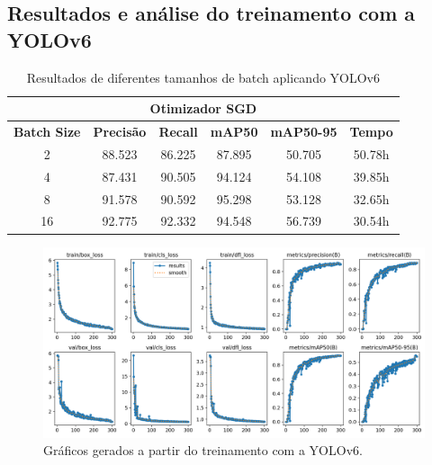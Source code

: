 \subsection{Resultados e análise do treinamento com a YOLOv6}

\begin{table}[!hbt]
    \centering
    \begin{tabular}{|c|c|c|c|c|c|}
    \hline
    \multicolumn{6}{|c|}{\textbf{Otimizador SGD}} \\ \hline
    \textbf{Batch Size} & \textbf{Precisão} & \textbf{Recall} & \textbf{mAP50} & \textbf{mAP50-95} & \textbf{Tempo} \\ \hline
    2                   & 88.523                & 86.225               & 87.895              & 50.705                 & 50.78h             \\ \hline
    4                   & 87.431                 & 90.505               & 94.124             & 54.108                & 39.85h             \\ \hline
    8                   & 91.578                 & 90.592               & 95.298              & 53.128                 & 32.65h             \\ \hline
    16                  & 92.775                & 92.332               & 94.548             & 56.739                 & 30.54h             \\ \hline
    \end{tabular}
    \caption{Resultados de diferentes tamanhos de batch aplicando YOLOv6}
    \label{tab:yolov6-teste}
\end{table}


\begin{figure}[!h]
    \centering
    \begin{minipage}{1\linewidth}
    \centering
    \captionsetup{justification=centering,margin=0.5cm,font=small}
    \includegraphics[width=1\linewidth]{img/cap6/results-yolov6-batch-16.png}
    \caption{Gráficos gerados a partir do treinamento com a YOLOv6.}
    \label{fig:yolov6batch16}
    \end{minipage}
\end{figure}


